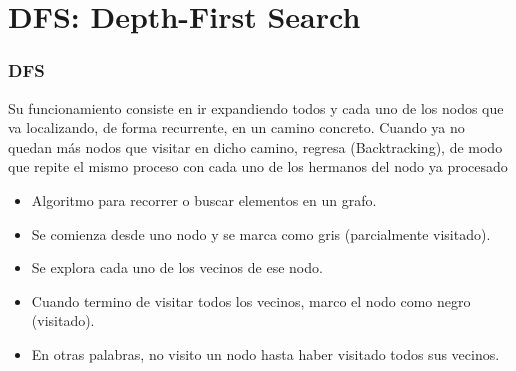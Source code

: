 \documentclass{beamer}
\begin{document}
\section{DFS: Depth-First Search}
	\begin{frame}
		\frametitle{DFS}
		
		Su funcionamiento consiste en ir expandiendo todos y cada uno de los nodos que va localizando, de forma recurrente, en un camino concreto. Cuando ya no quedan más nodos que visitar en dicho camino, regresa (Backtracking), de modo que repite el mismo proceso con cada uno de los hermanos del nodo ya procesado
		\begin{itemize}
			\item Algoritmo para recorrer o buscar elementos en un grafo.
			\item Se comienza desde uno nodo y se marca como gris (parcialmente visitado).
			\item Se explora cada uno de los vecinos de ese nodo.
			\item Cuando termino de visitar todos los vecinos, marco el nodo como negro (visitado).
			\item En otras palabras, no visito un nodo hasta haber visitado todos sus vecinos.
		\end{itemize}
	\end{frame}
	
\end{document}
